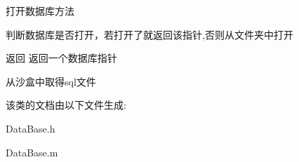 打开数据库方法 

判断数据库是否打开，若打开了就返回该指针,否则从文件夹中打开 \begin{DoxyReturn}{返回}
返回一个数据库指针 
\end{DoxyReturn}
从沙盒中取得sql文件 

该类的文档由以下文件生成\-:\begin{DoxyCompactItemize}
\item 
Data\-Base.\-h\item 
Data\-Base.\-m\end{DoxyCompactItemize}
